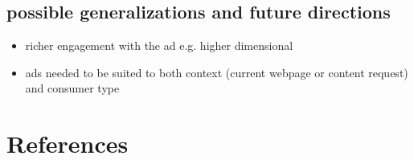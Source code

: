 \documentclass{article}
\begin{document}


\subsection{possible generalizations and future directions}

\begin{itemize}
	\item richer engagement with the ad e.g. higher dimensional
	\item ads needed to be suited to both context (current webpage or content request) and consumer type
\end{itemize}

\section{References}



\end{document}

